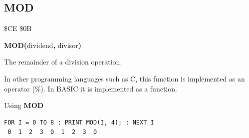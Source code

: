 
\newpage
\subsection{MOD}
\begin{description}[leftmargin=2cm,style=nextline]
\item [Token:]    \$CE \$0B

\item [Format:]   {\bf MOD(}dividend{\bf,} divisor{\bf)}

\item [Returns:]  The remainder of a division operation.

\item [Remarks:]  In other programming languages such as C, this function is implemented as an operator (\%). In BASIC it is implemented as a function.

\item [Example:]  Using {\bf MOD}

\begin{tcolorbox}[colback=black,coltext=white]
\verbatimfont{\codefont}
\begin{verbatim}
FOR I = 0 TO 8 : PRINT MOD(I, 4); : NEXT I
 0  1  2  3  0  1  2  3  0
\end{verbatim}
\end{tcolorbox}
\end{description}


\newpage
